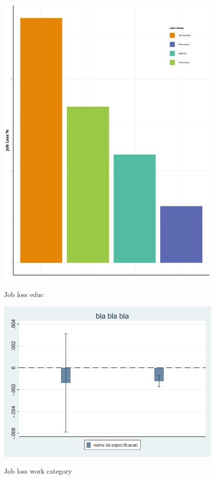 \documentclass[a4paper]{article}
\begin{document}
\begin{figure}[hb]
  \centering
  \caption{Job loss educ}
  \includegraphics[width=0.85\linewidth]{../analysis/output/graph/_graph_job_loss_work_arrangement.png}
  \label{fig:_graph_job_loss_work_arrangement}
\end{figure}


\begin{figure}[hb]
  \centering
  \caption{Job loss work category}
  \includegraphics[width=0.85\linewidth]{../analysis/output/graph/_graph_regression_job_loss_determinants.png}
  \label{fig:_graph_regression_job_loss_determinants}
\end{figure}
\end{document}
